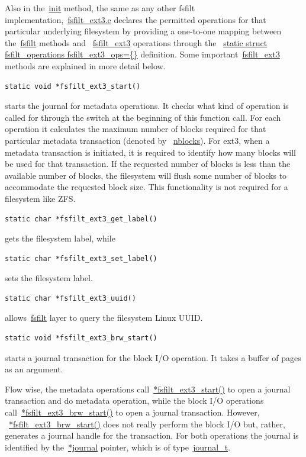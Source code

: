Also in the~\url{init} method, the same as any other fsfilt
implementation,~\url{fsfilt_ext3.c} declares the permitted operations for that
particular underlying filesystem by providing a one-to-one mapping between
the~\url{fsfilt} methods and ~\url{fsfilt_ext3} operations through the
~\url{static struct fsfilt_operations fsfilt_ext3_ops={}} definition. Some
important~\url{fsfilt_ext3} methods are explained in more detail below.

\begin{Verbatim}
static void *fsfilt_ext3_start() 
\end{Verbatim}

starts the journal for metadata operations. It checks what kind of operation is
called for through the switch at the beginning of this function call. For each
operation it calculates the maximum number of blocks required for that
particular metadata transaction (denoted by ~\url{nblocks}). For ext3, when a
metadata transaction is initiated, it is required to identify how many blocks
will be used for that transaction. If the requested number of blocks is less than
the available number of blocks, the filesystem will flush some number of blocks
to accommodate the requested block size. This functionality is not required for
a filesystem like ZFS.

\begin{Verbatim}
static char *fsfilt_ext3_get_label()
\end{Verbatim} 

gets the filesystem label, while

\begin{Verbatim}
static char *fsfilt_ext3_set_label()
\end{Verbatim} 

sets the filesystem label.

\begin{Verbatim}
static char *fsfilt_ext3_uuid()
\end{Verbatim}

allows~\url{fsfilt} layer to query the filesystem Linux UUID.

\begin{Verbatim}
static void *fsfilt_ext3_brw_start()
\end{Verbatim} 

starts a journal transaction for the block I/O operation. It takes a buffer of
pages as an argument.

Flow wise, the metadata operations call~\url{*fsfilt_ext3_start()} to open a
journal transaction and do metadata operation, while the block I/O operations
call~\url{*fsfilt_ext3_brw_start()} to open a journal transaction. However,
~\url{*fsfilt_ext3_brw_start()} does not really perform the block I/O but,
rather, generates a journal handle for the transaction. For both operations
the journal is identified by the~\url{*journal} pointer, which is of
type~\url{journal_t}.

